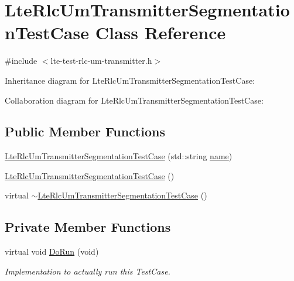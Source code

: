 \hypertarget{classLteRlcUmTransmitterSegmentationTestCase}{}\section{Lte\+Rlc\+Um\+Transmitter\+Segmentation\+Test\+Case Class Reference}
\label{classLteRlcUmTransmitterSegmentationTestCase}


{\ttfamily \#include $<$lte-\/test-\/rlc-\/um-\/transmitter.\+h$>$}



Inheritance diagram for Lte\+Rlc\+Um\+Transmitter\+Segmentation\+Test\+Case\+:


Collaboration diagram for Lte\+Rlc\+Um\+Transmitter\+Segmentation\+Test\+Case\+:
\subsection*{Public Member Functions}
\begin{DoxyCompactItemize}
\item 
\hyperlink{classLteRlcUmTransmitterSegmentationTestCase_a4b9c76c92cde665ed0742fd1fb45b431}{Lte\+Rlc\+Um\+Transmitter\+Segmentation\+Test\+Case} (std\+::string \hyperlink{generate__test__data__lte__spectrum__model_8m_ab74e6bf80237ddc4109968cedc58c151}{name})
\item 
\hyperlink{classLteRlcUmTransmitterSegmentationTestCase_a9868938e41b1c357c401631ce810fa07}{Lte\+Rlc\+Um\+Transmitter\+Segmentation\+Test\+Case} ()
\item 
virtual \hyperlink{classLteRlcUmTransmitterSegmentationTestCase_a084633b755df08d9b2bacc3ba2546258}{$\sim$\+Lte\+Rlc\+Um\+Transmitter\+Segmentation\+Test\+Case} ()
\end{DoxyCompactItemize}
\subsection*{Private Member Functions}
\begin{DoxyCompactItemize}
\item 
virtual void \hyperlink{classLteRlcUmTransmitterSegmentationTestCase_afd707870f8c3653a3a82d52c3bd62dac}{Do\+Run} (void)
\begin{DoxyCompactList}\small\item\em Implementation to actually run this Test\+Case. \end{DoxyCompactList}\end{DoxyCompactItemize}
